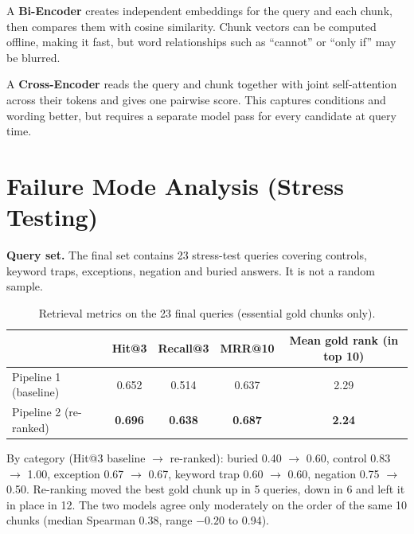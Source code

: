 \documentclass[10pt,a4paper]{article}
\newcommand{\ra}{$\rightarrow$}
\begin{document}
A \textbf{Bi-Encoder} creates independent embeddings for the query and each chunk, then compares them with cosine similarity. Chunk vectors can be computed offline, making it fast, but word relationships such as ``cannot'' or ``only if'' may be blurred.

A \textbf{Cross-Encoder} reads the query and chunk together with joint self-attention across their tokens and gives one pairwise score. This captures conditions and wording better, but requires a separate model pass for every candidate at query time.

\section{Failure Mode Analysis (Stress Testing)}

\textbf{Query set.} The final set contains 23 stress-test queries covering controls, keyword traps, exceptions, negation and buried answers. It is not a random sample.

\begin{table}[h]
\centering
\begin{tabular}{lcccc}
\toprule
 & Hit@3 & Recall@3 & MRR@10 & Mean gold rank (in top 10) \\
\midrule
Pipeline 1 (baseline)  & 0.652 & 0.514 & 0.637 & 2.29 \\
Pipeline 2 (re-ranked) & \textbf{0.696} & \textbf{0.638} & \textbf{0.687} & \textbf{2.24} \\
\bottomrule
\end{tabular}
\caption{Retrieval metrics on the 23 final queries (essential gold chunks only).}
\end{table}

By category (Hit@3 baseline \ra{} re-ranked): buried 0.40 \ra{} 0.60, control 0.83 \ra{} 1.00, exception 0.67 \ra{} 0.67, keyword trap 0.60 \ra{} 0.60, negation 0.75 \ra{} 0.50. Re-ranking moved the best gold chunk up in 5 queries, down in 6 and left it in place in 12. The two models agree only moderately on the order of the same 10 chunks (median Spearman 0.38, range $-0.20$ to 0.94).
\end{document}
